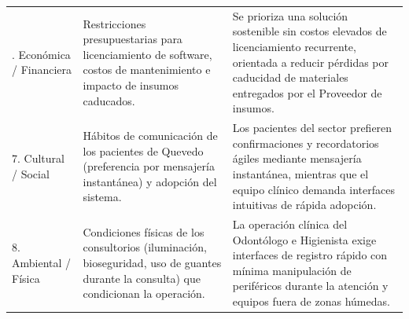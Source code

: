 \begin{table}[htbp]
\begin{tabularx}{\textwidth}{
>{\raggedright\arraybackslash}p{2.25cm}
>{\raggedright\arraybackslash}X
>{\raggedright\arraybackslash}X}
6. Económica / Financiera &
Restricciones presupuestarias para licenciamiento de software, costos de mantenimiento e impacto de insumos caducados. &
Se prioriza una solución sostenible sin costos elevados de licenciamiento recurrente, orientada a reducir pérdidas por caducidad de materiales entregados por el Proveedor de insumos.\\
\addlinespace

7. Cultural / Social &
Hábitos de comunicación de los pacientes de Quevedo (preferencia por mensajería instantánea) y adopción del sistema. &
Los pacientes del sector prefieren confirmaciones y recordatorios ágiles mediante mensajería instantánea, mientras que el equipo clínico demanda interfaces intuitivas de rápida adopción.\\
\addlinespace

8. Ambiental / Física &
Condiciones físicas de los consultorios (iluminación, bioseguridad, uso de guantes durante la consulta) que condicionan la operación. &
La operación clínica del Odontólogo e Higienista exige interfaces de registro rápido con mínima manipulación de periféricos durante la atención y equipos fuera de zonas húmedas.\\
\bottomrule
\end{tabularx}
\endgroup
\end{table}

